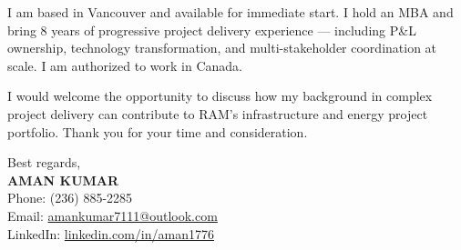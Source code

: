\documentclass[11pt]{article}
\begin{document}
\vspace{4pt}
I am based in Vancouver and available for immediate start. I hold an MBA and bring 8 years of progressive project delivery experience --- including P\&L ownership, technology transformation, and multi-stakeholder coordination at scale. I am authorized to work in Canada.

\vspace{4pt}
I would welcome the opportunity to discuss how my background in complex project delivery can contribute to RAM's infrastructure and energy project portfolio. Thank you for your time and consideration.

\vspace{8pt}
Best regards, \\
\textbf{AMAN KUMAR} \\
Phone: (236) 885-2285 \\
Email: \href{amankumar7111@outlook.com}{amankumar7111@outlook.com} \\
LinkedIn: \href{linkedin.com/in/aman1776}{linkedin.com/in/aman1776}
\end{document}
